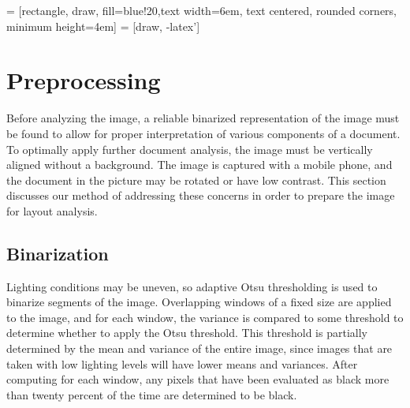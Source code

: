 \documentclass{report}
\begin{document}
 = [rectangle, draw, fill=blue!20,text width=6em, text centered, rounded corners, minimum height=4em]
 = [draw, -latex']



\chapter{Preprocessing}
Before analyzing the image, a reliable binarized representation of the image must be found to allow for proper interpretation of various components of a document. To optimally apply further document analysis, the image must be vertically aligned without a background. The image is captured with a mobile phone, and the document in the picture may be rotated or have low contrast. This section discusses our method of addressing these concerns in order to prepare the image for layout analysis.

\section{Binarization}
Lighting conditions may be uneven, so adaptive Otsu thresholding is used to binarize segments of the image. Overlapping windows of a fixed size are applied to the image, and for each window, the variance is compared to some threshold to determine whether to apply the Otsu threshold. This threshold is partially determined by the mean and variance of the entire image, since images that are taken with low lighting levels will have lower means and variances. After computing for each window, any pixels that have been evaluated as black more than twenty percent of the time are determined to be black.
\end{document}
